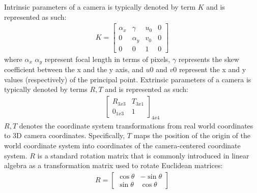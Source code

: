 \documentclass[10pt,twocolumn]{article}
\begin{document}
Intrinsic parameters of a camera is typically denoted by term \begin{math}K\end{math} and is represented as such:
\begin{gather}
K={\begin{bmatrix}\alpha _{x}&\gamma &u_{0}&0\\0&\alpha _{y}&v_{0}&0\\0&0&1&0\end{bmatrix}}
\end{gather}
where \begin{math}\alpha _{x}\end{math} \begin{math}\alpha _{y}\end{math} represent focal length in terms of pixels, \begin{math}\gamma\end{math} represents the skew coefficient between the x and the y axis, and \begin{math}u{0}\end{math} and \begin{math}v{0}\end{math} represent the x and y values (respectively) of the principal point.
Extrinsic parameters of a camera is typically denoted by terms \begin{math}R, T\end{math} and is represented as such:
\begin{gather}
\begin{bmatrix}R _{3x3}&T_{3x1} \\ 0 _{1x3}&1\end{bmatrix}_{4x4}
\end{gather}
\begin{math}R, T\end{math} denotes the coordinate system transformations from real world coordinates to 3D camera coordinates. Specifically, \begin{math}T\end{math} maps the position of the origin of the world coordinate system into coordinates of the camera-centered coordinate system. \begin{math}R\end{math} is a standard rotation matrix that is commonly introduced in linear algebra as a transformation matrix used to rotate Euclidean matrices:
\begin{gather}
R={\begin{bmatrix}\cos \theta &-\sin \theta \\\sin \theta &\cos \theta \end{bmatrix}}
\end{gather}
\end{document}
